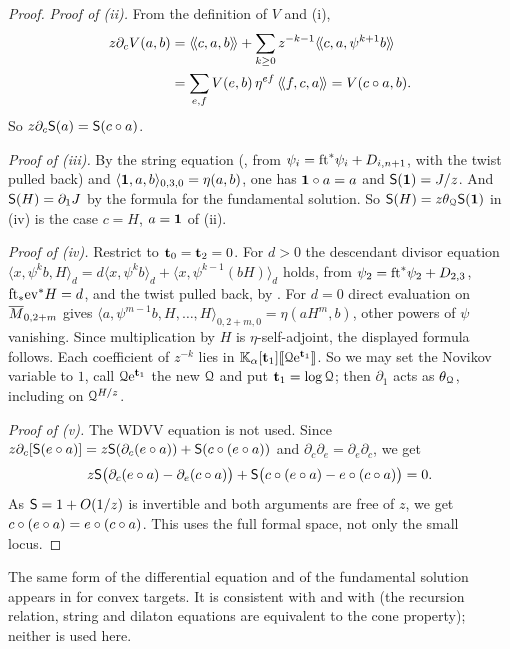 \begin{proof}
\emph{Proof of (ii).} From the definition of $V$ and (i),
\begin{align*}
z\partial_cV(a,b)&=\langle\!\langle c,a,b \rangle\!\rangle+\sum_{k\geq0}z^{-k-1}\langle\!\langle c,a,\psi^{k+1}b \rangle\!\rangle\\
&=\sum_{e,f}V(e,b)\,\eta^{ef}\,\langle\!\langle f,c,a \rangle\!\rangle=V(c\circ a,b).
\end{align*}
So $z\partial_c\mathsf{S}(a)=\mathsf{S}(c\circ a)$.

\emph{Proof of (iii).} By the string equation (\cite[Section~1.2, I]{Pan98}, from $\psi_i=\mathrm{ft}^*\psi_i+D_{i,n+1}$, with the twist pulled back) and $\langle\mathbf{1},a,b\rangle_{0,3,0}=\eta(a,b)$, one has $\mathbf{1}\circ a=a$ and $\mathsf{S}(\mathbf{1})=J/z$. And $\mathsf{S}(H)=\partial_1J$ by the formula for the fundamental solution. So $\mathsf{S}(H)=z\theta_{\mathcal{Q}}\mathsf{S}(\mathbf{1})$ in (iv) is the case $c=H$, $a=\mathbf{1}$ of (ii).

\emph{Proof of (iv).} Restrict to $\mathbf{t}_0=\mathbf{t}_2=0$. For $d>0$ the descendant divisor equation $\langle x,\psi^kb,H\rangle_d=d\langle x,\psi^kb\rangle_d+\langle x,\psi^{k-1}(bH)\rangle_d$ holds, from $\psi_2=\mathrm{ft}^*\psi_2+D_{2,3}$, $\mathrm{ft}_*\mathrm{ev}^*H=d$, and the twist pulled back, by \cite[App.~1 (iv)]{CG07}. For $d=0$ direct evaluation on $\overline{M}_{0,2+m}$ gives $\langle a,\psi^{m-1}b,H,\dots,H\rangle_{0,2+m,0}=\eta(aH^m,b)$, other powers of $\psi$ vanishing. Since multiplication by $H$ is $\eta$-self-adjoint, the displayed formula follows. Each coefficient of $z^{-k}$ lies in $\mathbb{K}_{\alpha}[\mathbf{t}_1][\![ \mathcal{Q}\mathrm{e}^{\mathbf{t}_1} ]\!]$. So we may set the Novikov variable to $1$, call $\mathcal{Q}\mathrm{e}^{\mathbf{t}_1}$ the new $\mathcal{Q}$ and put $\mathbf{t}_1=\log\mathcal{Q}$; then $\partial_1$ acts as $\theta_{\mathcal{Q}}$, including on $\mathcal{Q}^{H/z}$.

\emph{Proof of (v).} The WDVV equation is not used. Since $z\partial_c[\mathsf{S}(e\circ a)]=z\mathsf{S}(\partial_c(e\circ a))+\mathsf{S}(c\circ(e\circ a))$ and $\partial_c\partial_e=\partial_e\partial_c$, we get
\[
z\mathsf{S}\big(\partial_c(e\circ a)-\partial_e(c\circ a)\big)+\mathsf{S}\big(c\circ(e\circ a)-e\circ(c\circ a)\big)=0.
\]
As $\mathsf{S}=1+O(1/z)$ is invertible and both arguments are free of $z$, we get $c\circ(e\circ a)=e\circ(c\circ a)$. This uses the full formal space, not only the small locus.
\end{proof}

\begin{rmk}
The same form of the differential equation and of the fundamental solution appears in \cite[Section~1.2 (6), Section~1.3 Prop.~2]{Pan98} for convex targets. It is consistent with \cite[Theorem 2]{CCIT15} and with \cite[Theorem 1]{Giv03} (the recursion relation, string and dilaton equations are equivalent to the cone property); neither is used here.
\end{rmk}

